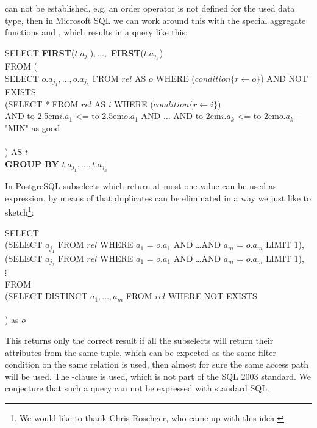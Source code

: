 can not be established, e.g. an order operator is not defined for the
used data type, then in Microsoft SQL we can work around this with the
special aggregate functions  and ,
which results in a query like this:
%
\begin{sql}
\newcommand\abox[1]{\hbox to 2.5em{#1\hfil}}%
\newcommand\bbox[1]{\hbox to 2em{#1\hfil}}%
SELECT \textbf{FIRST}($t.a_{j_1}$)$, \ldots, $ \textbf{FIRST}($t.a_{j_h}$) \\
FROM (\\
SELECT $o.a_{j_1}, \ldots, o.a_{j_h}$ FROM $rel$ AS $o$ WHERE ($condition\{r \gets o\}$) AND NOT EXISTS \\
(SELECT * FROM $rel$ AS $i$ WHERE ($condition\{r \gets i\}$) \\
AND \abox{$i.a_1$} <= \abox{$o.a_1$} AND $\ldots$ AND \bbox{$i.a_k$} <= \bbox{$o.a_k$} -- "MIN" as good\\
 \\
) AS $t$ \\
\textbf{GROUP BY} $t.a_{j_1}, \ldots, t.a_{j_h}$
\end{sql}

In PostgreSQL subselects which return at most one value can be used as
expression, by means of that duplicates can be eliminated in a way we
just like to sketch\footnote{We would like to thank Chris Roschger,
who came up with this idea.}:

\begin{sql}
SELECT \\
(SELECT $a_{j_1}$ FROM $rel$ WHERE $a_1$ = $o.a_1$ AND \ldots AND $a_m$ = $o.a_m$ LIMIT 1), \\
(SELECT $a_{j_2}$ FROM $rel$ WHERE $a_1$ = $o.a_1$ AND \ldots AND $a_m$ = $o.a_m$ LIMIT 1), \\
$\vdots$ \\
FROM\\
(SELECT DISTINCT $a_1, \ldots, a_m$ FROM $rel$ WHERE NOT EXISTS\\
 \\
) as $o$
\end{sql}

This returns only the correct result if all the subselects will return
their attributes from the same tuple, which can be expected as the same
filter condition on the same relation is used, then almost for sure
the same access path will be used.  The -clause is
used, which is not part of the SQL 2003 standard. We conjecture that
such a query can not be expressed with standard SQL.

